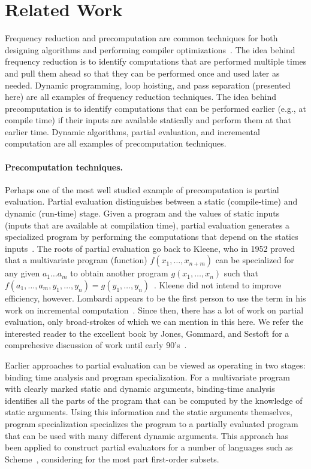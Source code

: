 \section{Related Work}
\label{sec:related}

Frequency reduction and precomputation are common techniques for both
designing algorithms and performing compiler
optimizations~\cite{JS86-staging}.  The idea behind frequency
reduction is to identify computations that are performed multiple
times and pull them ahead so that they can be performed once and used
later as needed.  Dynamic programming, loop hoisting, and pass
separation (presented here) are all examples of frequency reduction
techniques.
%
The idea behind precomputation is to identify computations that can be
performed earlier (e.g., at compile time) if their inputs are
available statically and perform them at that earlier time. Dynamic
algorithms, partial evaluation, and incremental computation are all
examples of precomputation techniques.

\paragraph{Precomputation techniques.}
Perhaps one of the most well studied example of precomputation is
partial evaluation.  Partial evaluation distinguishes between a static
(compile-time) and dynamic (run-time) stage. Given a program and the
values of static inputs (inputs that are available at compilation
time), partial evaluation generates a specialized program by
performing the computations that depend on the statics
inputs~\cite{jones96}.  The roots of partial evaluation go back to
Kleene, who in 1952 proved that a multivariate program (function)
$f(x_1, \ldots, x_{n+m})$ can be specialized for any given $a_1 \ldots
a_m$ to obtain another program $g(x_1, \ldots, x_n)$ such that $f(a_1,
\ldots, a_m, y_1, \ldots, y_n) = g(y_1, \ldots, y_n)$~\cite{Kleene52}.
Kleene did not intend to improve efficiency, however.  Lombardi
appears to be the first person to use the term in his work on
incremental computation~\cite{Lombardi67}.  Since then, there has a
lot of work on partial evaluation, only broad-strokes of which we can
mention in this here.  We refer the interested reader to the excellent
book by Jones, Gommard, and Sestoft for a comprehesive discussion of
work until early 90's~\cite{JGS93}.

Earlier approaches to partial evaluation can be viewed as operating in
two stages: binding time analysis and program specialization.  For a
multivariate program with clearly marked static and dynamic arguments,
binding-time analysis identifies all the parts of the program that can
be computed by the knowledge of static arguments. Using this
information and the static arguments themselves, program
specialization specializes the program to a partially evaluated
program that can be used with many different dynamic arguments.  This
approach has been applied to construct partial evaluators for a number
of languages such as Scheme~\cite{OB91-Similix,Consel88-Schism},
considering for the most part first-order subsets.

